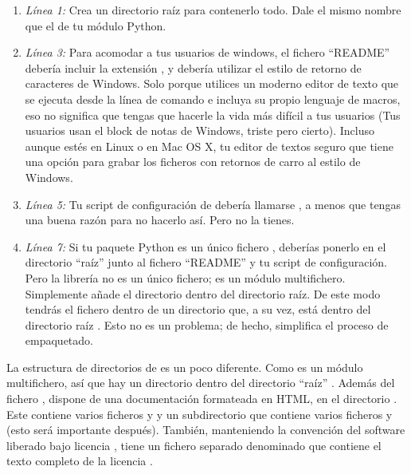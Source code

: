 \begin{enumerate}
  \item \emph{Línea 1:} Crea un directorio raíz para contenerlo todo. Dale el mismo nombre que el de tu módulo Python.
  \item \emph{Línea 3:} Para acomodar a tus usuarios de windows, el fichero ``README'' debería incluir la extensión , y debería utilizar el estilo de retorno de caracteres de Windows. Solo porque utilices un moderno editor de texto que se ejecuta desde la línea de comando e incluya su propio lenguaje de macros, eso no significa que tengas que hacerle la vida más difícil a tus usuarios (Tus usuarios usan el block de notas de Windows, triste pero cierto). Incluso aunque estés en Linux o en Mac OS X, tu editor de textos seguro que tiene una opción para grabar los ficheros con retornos de carro al estilo de Windows.

  \item \emph{Línea 5:} Tu script de configuración de  debería llamarse , a menos que tengas una buena razón para no hacerlo así. Pero no la tienes.
  \item \emph{Línea 7:} Si tu paquete Python es un único fichero , deberías ponerlo en el directorio ``raíz'' junto al fichero ``README'' y tu script de configuración. Pero la librería  no es un único fichero; es un módulo multifichero. Simplemente añade el directorio  dentro del directorio raíz. De este modo tendrás el fichero  dentro de un directorio  que, a su vez, está dentro del directorio raíz . Esto no es un problema; de hecho, simplifica el proceso de empaquetado.
\end{enumerate}

La estructura de directorios de  es un poco diferente. Como  es un módulo multifichero, así que hay un directorio  dentro del directorio ``raíz'' . Además del fichero ,  dispone de una documentación formateada en HTML, en el directorio . Este contiene varios ficheros  y  y un subdirectorio  que contiene varios ficheros  y  (esto será importante después). También, manteniendo la convención del software liberado bajo licencia , tiene un fichero separado denominado  que contiene el texto completo de la licencia .


